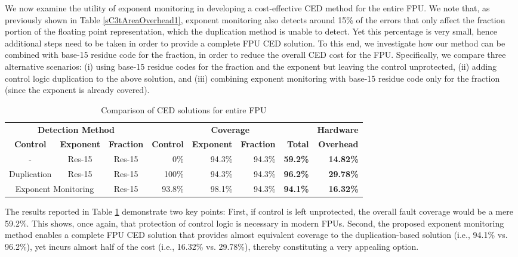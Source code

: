 \documentclass[12pt]{yalephd}
\begin{document}
We now examine the utility of exponent monitoring in developing a cost-effective CED method for the entire FPU. We note that, as previously shown in Table \ref{sC3tAreaOverhead1}, exponent monitoring also detects around 15\% of the errors that only affect the fraction portion of the floating point representation, which the duplication method is unable to detect. Yet this percentage is very small, hence additional steps need to be taken in order to provide a complete FPU CED solution. To this end, we investigate how our method can be combined with base-15 residue code for the fraction, in order to reduce the overall CED cost for the FPU. Specifically, we compare three alternative scenarios: (i) using base-15 residue codes for the fraction and the exponent but leaving the control unprotected, (ii) adding control logic duplication to the above solution, and (iii) combining exponent monitoring with base-15 residue code only for the fraction (since the exponent is already covered).

\begin{table}[!ht]
\caption{Comparison of CED solutions for entire FPU}\label{sC3tAreaOverhead}
\footnotesize
\tabcolsep=0.10cm
\begin{center}
\begin{threeparttable}[b]
\begin{tabular}{||c|c|c||r|r|r|r||r||}
\hline
\hline
\multicolumn{3}{||c||}{\bf Detection Method} & \multicolumn{4}{c||}{\bf Coverage} & {\bf Hardware}\\
{\bf Control} &  {\bf Exponent}& {\bf Fraction} & {\bf Control} &  {\bf Exponent}& {\bf Fraction} & {\bf Total} & {\bf Overhead}\\
\hline
\hline
- & Res-15 & Res-15                                  &    0\% & 94.3\% & 94.3\% & {\bf 59.2\%} & {\bf 14.82\%} \\
\hline
Duplication & Res-15 & Res-15                        &  100\% & 94.3\% & 94.3\% & {\bf 96.2\%} & {\bf 29.78\%} \\
\hline
\multicolumn{2}{||c|}{Exponent Monitoring}  & Res-15 & 93.8\% & 98.1\% & 94.3\% & {\bf 94.1\%} & {\bf 16.32\%} \\
\hline
\hline
\end{tabular}
\end{threeparttable}
\end{center}
\end{table}

The results reported in Table \ref{sC3tAreaOverhead} demonstrate two key points: First, if control is left unprotected, the overall fault coverage would be a mere 59.2\%. This shows, once again, that protection of control logic is necessary in modern FPUs. Second, the proposed exponent monitoring method enables a complete FPU CED solution that provides almost equivalent coverage to the duplication-based solution (i.e., 94.1\% vs. 96.2\%), yet incurs almost half of the cost (i.e., 16.32\% vs. 29.78\%), thereby constituting a very appealing option.
\end{document}
